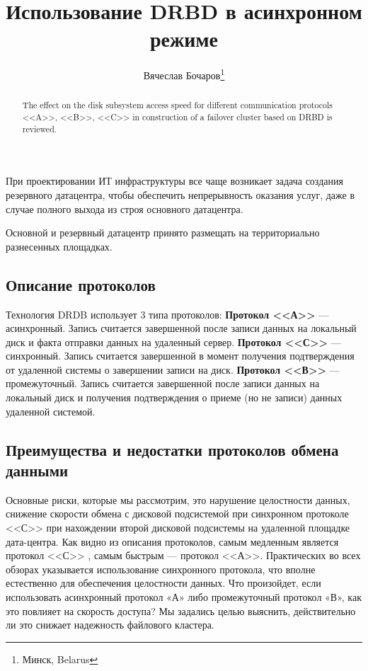 \documentclass[10pt, a5paper]{article}
\begin{document}
\title{Использование DRBD в асинхронном режиме}%

\author{Вячеслав Бочаров\footnote{Минск, Belarus}}
\maketitle

\begin{abstract}
The effect on the disk subsystem access speed for different communication protocols <<A>>, <<B>>, <<C>> in construction of a failover cluster based on DRBD is reviewed.
\end{abstract}

При проектировании ИТ инфраструктуры все чаще возникает задача создания резервного датацентра, чтобы обеспечить непрерывность оказания услуг, даже в случае полного выхода из строя основного датацентра.

Основной и резервный датацентр принято размещать на территориально разнесенных площадках.

\subsection*{Описание протоколов}

Технология DRDB использует 3 типа протоколов:
\textbf{Протокол <<А>>} --- асинхронный. Запись считается завершенной после записи данных на локальный диск и факта отправки данных на удаленный сервер.
\textbf{Протокол <<С>>} --- синхронный. Запись считается завершенной в момент получения подтверждения от удаленной системы о завершении записи на диск.
\textbf{Протокол <<В>>} --- промежуточный. Запись считается завершенной после записи данных на локальный диск и получения подтверждения о приеме (но не записи) данных удаленной системой.

\subsection*{Преимущества и недостатки протоколов обмена данными}

Основные риски, которые мы рассмотрим, это нарушение целостности данных, снижение скорости обмена с дисковой подсистемой при синхронном протоколе <<С>> при нахождении второй дисковой подсистемы на удаленной площадке дата-центра.
Как видно из описания протоколов, самым медленным является протокол <<С>> , самым быстрым --- протокол <<А>>.
Практических во всех обзорах указывается использование синхронного протокола, что вполне естественно для обеспечения целостности данных.
Что произойдет, если использовать асинхронный протокол «А» либо промежуточный протокол «В», как это повлияет на скорость доступа? Мы задались целью выяснить, действительно ли это снижает надежность файлового кластера.
\end{document}
